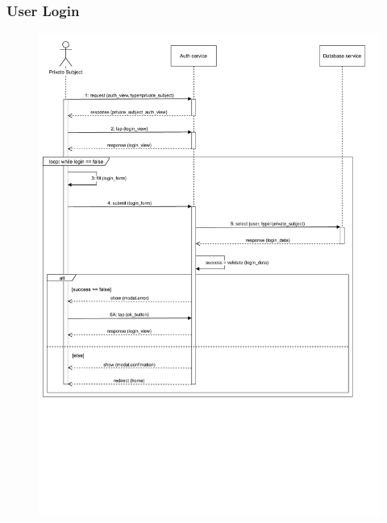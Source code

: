 \documentclass[12pt,a4paper]{article}
\begin{document}
\subsubsection{User Login}
\begin{figure}[H]
				\centering
				\includegraphics[width=1\textwidth,height=0.9\textheight,keepaspectratio]{assets/sequence_diagrams/exports/login_private_subject.pdf}
				\label{fig:loginUser_sequence}
			\end{figure}
\end{document}
